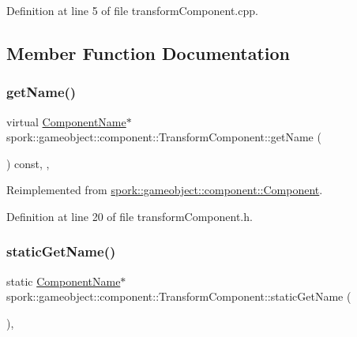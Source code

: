 Definition at line 5 of file transform\+Component.\+cpp.



\subsection{Member Function Documentation}
\mbox{\label{classspork_1_1gameobject_1_1component_1_1_transform_component_a36194e25608601dbf7c6def7f988ecc1}} 
\subsubsection{\texorpdfstring{get\+Name()}{getName()}}
{\footnotesize\ttfamily virtual \hyperlink{structspork_1_1gameobject_1_1component_1_1_component_name}{Component\+Name}$\ast$ spork\+::gameobject\+::component\+::\+Transform\+Component\+::get\+Name (\begin{DoxyParamCaption}{ }\end{DoxyParamCaption}) const\hspace{0.3cm}{\ttfamily [inline]}, {\ttfamily [override]}, {\ttfamily [virtual]}}



Reimplemented from \hyperlink{classspork_1_1gameobject_1_1component_1_1_component_ac47356483f2a091e46ad7aaf99cb1595}{spork\+::gameobject\+::component\+::\+Component}.



Definition at line 20 of file transform\+Component.\+h.

\mbox{\label{classspork_1_1gameobject_1_1component_1_1_transform_component_a6ba87bfd4c64228b6a5dd7648ba5c3d9}} 
\subsubsection{\texorpdfstring{static\+Get\+Name()}{staticGetName()}}
{\footnotesize\ttfamily static \hyperlink{structspork_1_1gameobject_1_1component_1_1_component_name}{Component\+Name}$\ast$ spork\+::gameobject\+::component\+::\+Transform\+Component\+::static\+Get\+Name (\begin{DoxyParamCaption}{ }\end{DoxyParamCaption})\hspace{0.3cm}{\ttfamily [inline]}, {\ttfamily [static]}}



